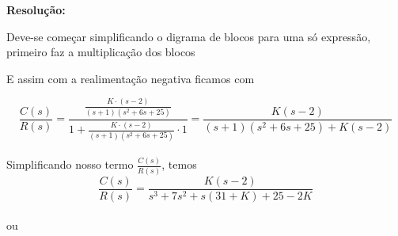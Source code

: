 \begin{figure}[H]
\centering
{}
\end{figure}

\noindent \textbf{Resolução: }

Deve-se começar simplificando o digrama de blocos para uma só expressão, primeiro faz a multiplicação dos blocos


\begin{figure}[H]
\centering
{}
\end{figure}

E assim com a realimentação negativa ficamos com
\newpage

\[ \dfrac{C(s)}{R(s)} = \dfrac{\frac{K\cdot (s-2)}{(s+1)(s^2+6s+25)}}{1+ \frac{K\cdot (s-2)}{(s+1)(s^2+6s+25)}\cdot 1} = \dfrac{K(s -2)}{(s+1)(s^2+6s+25)+K(s-2)} \] \\

Simplificando nosso termo \( \frac{C(s)}{R(s)} \), temos \\

\[ \dfrac{C(s)}{R(s)} = \dfrac{K(s-2)}{s^3 + 7s^2 + s(31 + K)+25 -2K} \] \\

ou \\

\begin{figure}[H]
\centering
{}
\end{figure}

